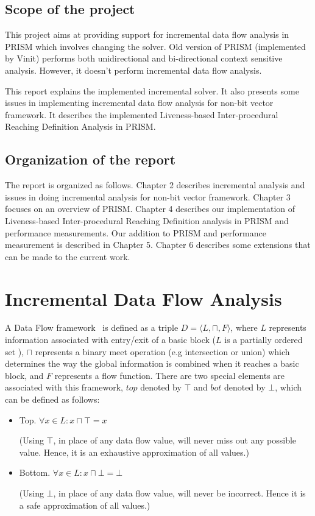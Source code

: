 \documentclass[11pt,a4paper,openright]{report}
\begin{document}
\section{Scope of the project}

This project aims at providing support for incremental data flow analysis in PRISM which involves changing the solver. Old version of PRISM 
(implemented by Vinit) performs both unidirectional and bi-directional context sensitive analysis. However, it doesn't perform incremental data flow analysis.

This report explains the implemented incremental solver. It also presents some issues in implementing incremental data flow analysis for non-bit vector
framework. It describes the implemented Liveness-based Inter-procedural Reaching Definition Analysis in PRISM.




\section{Organization of the report}
The report is organized as follows. Chapter 2 describes incremental analysis and issues in doing incremental analysis for non-bit vector framework.
Chapter 3 focuses on an overview of PRISM. Chapter 4 describes our implementation of Liveness-based Inter-procedural Reaching Definition analysis in 
PRISM and performance measurements. Our addition to PRISM and performance measurement is described in Chapter 5. Chapter 6 describes some extensions
that can be made to the current work. 


\chapter{Incremental Data Flow Analysis}
A Data Flow framework~\cite{thesis_sir} is defined as a triple $D =\langle L,\sqcap,F\rangle$, where $L$ represents information associated 
with entry/exit of a basic block ($L$ is a partially ordered set ), $\sqcap$ represents a binary meet operation (e.g intersection or union) 
which determines the way the global information is combined when it reaches a basic block, and $F$ represents a flow function. 
There are two special elements are associated with this framework, $top$ denoted by $\top$ and $bot$ denoted by $\bot$, 
which can be defined as follows:
\begin{itemize}
\item {Top.}
$\forall x \in L : x \sqcap \top = x $ 

(Using $\top$, in place of any data flow value, will never miss out any possible value. Hence, it is an exhaustive approximation of all values.)

\item {Bottom.}
$\forall x \in L : x \sqcap \bot =\bot $

(Using $\bot$, in place of any data flow value, will never be incorrect. Hence it is a safe approximation of all values.)


\end{itemize}
\end{document}
